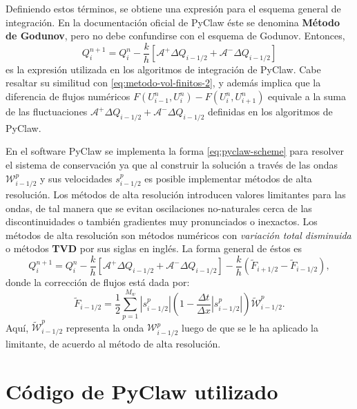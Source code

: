 Definiendo estos términos, se obtiene una expresión para el esquema general de integración. En la documentación oficial de PyClaw éste se denomina \textbf{Método de Godunov}, pero no debe confundirse con el esquema de Godunov. Entonces,
\begin{equation}
	Q_{i}^{n+1} = Q_{i}^{n} - \frac{k}{h}\left[\mathcal{A}^{+}\Delta Q_{i-1/2} + \mathcal{A}^{-}\Delta Q_{i-1/2}\right]
	\label{eq:pyclaw-scheme}
\end{equation}
es la expresión utilizada en los algoritmos de integración de PyClaw. Cabe resaltar su similitud con \eqref{eq:metodo-vol-finitos-2}, y además implica que la diferencia de flujos numéricos $F(U_{i-1}^n, U_i^n) - F(U_{i}^n, U_{i+1}^n)$ equivale a la suma de las fluctuaciones $\mathcal{A}^{+}\Delta Q_{i-1/2} + \mathcal{A}^{-}\Delta Q_{i-1/2}$ definidas en los algoritmos de PyClaw.

En el software PyClaw se implementa la forma \eqref{eq:pyclaw-scheme} para resolver el sistema de conservación ya que al construir la solución a través de las ondas $\mathcal{W}_{i-1/2}^{p}$ y sus velocidades $s_{i-1/2}^{p}$ es posible implementar métodos de alta resolución. Los métodos de alta resolución introducen valores limitantes para las ondas, de tal manera que se evitan oscilaciones no-naturales cerca de las discontinuidades o también gradientes muy pronunciados o inexactos. Los métodos de alta resolución son métodos numéricos con \textit{variación total disminuida} o métodos \textbf{TVD} por sus siglas en inglés. La forma general de éstos es
\begin{equation}
	Q_{i}^{n+1} = Q_{i}^{n} - \frac{k}{h}\left[\mathcal{A}^{+}\Delta Q_{i-1/2} + \mathcal{A}^{-}\Delta Q_{i-1/2}\right] - \frac{k}{h}\left(\tilde{F}_{i+1/2} - \tilde{F}_{i-1/2}\right),
\end{equation}
donde la corrección de flujos está dada por:
\begin{equation}
	\tilde{F}_{i-1 / 2}=\frac{1}{2} \sum_{p=1}^{M_w}\left|s_{i-1 / 2}^p\right|\left(1-\frac{\Delta t}{\Delta x}\left|s_{i-1 / 2}^p\right|\right) \tilde{\mathcal{W}}_{i-1 / 2}^p .
\end{equation}
Aquí, $\tilde{\mathcal{W}}_{i-1 / 2}^p$ representa la onda ${\mathcal{W}}_{i-1 / 2}^p$ luego de que se le ha aplicado la limitante, de acuerdo al método de alta resolución.

\section{Código de PyClaw utilizado}
